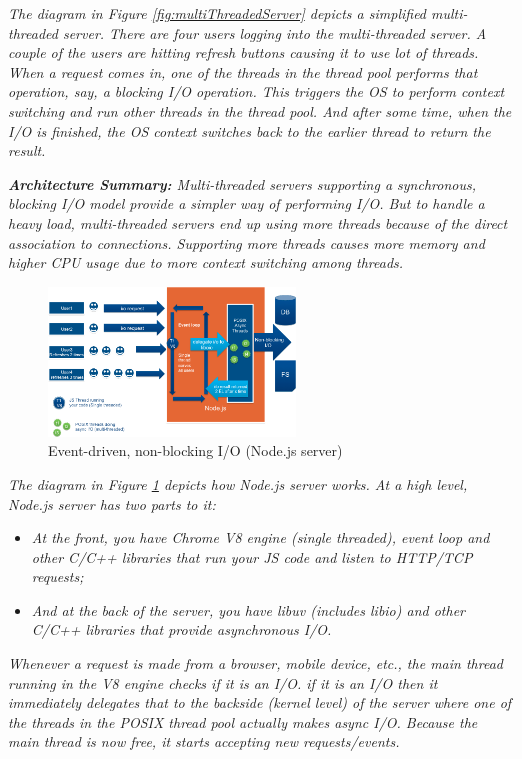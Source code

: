 \textit{The diagram in Figure \ref{fig:multiThreadedServer} depicts a simplified multi-threaded server. There are four users logging into the multi-threaded server. A couple of the users are hitting refresh buttons causing it to use lot of threads. When a request comes in, one of the threads in the thread pool performs that operation, say, a blocking I/O operation. This triggers the OS to perform context switching and run other threads in the thread pool. And after some time, when the I/O is finished, the OS context switches back to the earlier thread to return the result.}

\textit{\textbf{Architecture Summary:} Multi-threaded servers supporting a synchronous, blocking I/O model provide a simpler way of performing I/O. But to handle a heavy load, multi-threaded servers end up using more threads because of the direct association to connections. Supporting more threads causes more memory and higher CPU usage due to more context switching among threads.}

\begin{figure}[H]
\centering %
\includegraphics[height=150px]{img/NodeJS-EventedIOAsyncIO_latest.png}
\caption{Event-driven, non-blocking I/O (Node.js server)}
\label{fig:nodejsServer}
\end{figure}

\textit{The diagram in Figure \ref{fig:nodejsServer} depicts how Node.js server works. At a high level, Node.js server has two parts to it:}
\begin{itemize}
\item \textit{At the front, you have Chrome V8 engine (single threaded), event loop and other C/C++ libraries that run your JS code and listen to HTTP/TCP requests;}
\item \textit{And at the back of the server, you have libuv (includes libio) and other C/C++ libraries that provide asynchronous I/O.}
\end{itemize}

\textit{Whenever a request is made from a browser, mobile device, etc., the main thread running in the V8 engine checks if it is an I/O. if it is an I/O then it immediately delegates that to the backside (kernel level) of the server where one of the threads in the POSIX thread pool actually makes async I/O. Because the main thread is now free, it starts accepting new requests/events.}

